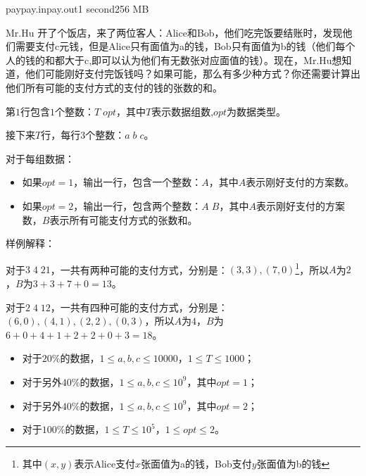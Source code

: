 \documentclass[11pt,a4paper,oneside]{article}
\begin{document}
\begin{problem}{pay}{pay.in}{pay.out}{1 second}{256 MB}

	Mr.Hu 开了个饭店，来了两位客人：Alice和Bob，他们吃完饭要结账时，发现他们需要支付c元钱，但是Alice只有面值为a的钱，Bob只有面值为b的钱（他们每个人的钱的和都大于c,即可以认为他们有无数张对应面值的钱）。现在，Mr.Hu想知道，他们可能刚好支付完饭钱吗？如果可能，那么有多少种方式？你还需要计算出他们所有可能的支付方式的支付的钱的张数的和。

    \InputFile

    第$1$行包含$1$个整数：$T \; opt$，其中$T$表示数据组数,$opt$为数据类型。

	接下来$T$行，每行$3$个整数：$a \; b\; c$。

    \OutputFile
    
    对于每组数据：
    \begin{itemize}
    	\item 如果$opt = 1$，输出一行，包含一个整数：$A$，其中$A$表示刚好支付的方案数。
    	\item 如果$opt = 2$，输出一行，包含两个整数：$A \; B$，其中$A$表示刚好支付的方案数，$B$表示所有可能支付方式的张数和。
    \end{itemize}
    
    \Example

    \begin{example}
    \end{example}
	
	样例解释：
	
	对于$3 \; 4 \; 21$，一共有两种可能的支付方式，分别是：$(3,3), (7,0)$\footnote{其中$(x,y)$表示Alice支付$x$张面值为a的钱，Bob支付$y$张面值为b的钱}，所以$A$为$2$，$B$为$3 + 3 + 7 + 0 = 13$。
	
	对于$2 \; 4 \; 12$，一共有四种可能的支付方式，分别是：$(6,0),(4,1),(2,2),(0,3)$，所以$A$为$4$，$B$为$6 + 0 + 4 + 1 + 2 + 2 + 0 + 3 = 18$。
	
	\begin{example}
	\end{example}
	
    \Note
    
    \begin{itemize}
		\item 对于$20\%$的数据，$1 \leq a, b, c \leq 10000$，$1 \leq T \leq 1000$；
		\item 对于另外$40\%$的数据，$1 \leq a, b, c \leq 10^9$，其中$opt = 1$；
		\item 对于另外$40\%$的数据，$1 \leq a, b, c \leq 10^9$，其中$opt = 2$；
		\item 对于$100\%$的数据，$1 \leq T \leq 10^5$，$1 \leq opt \leq 2$。
    \end{itemize}

\end{problem}
\end{document}
